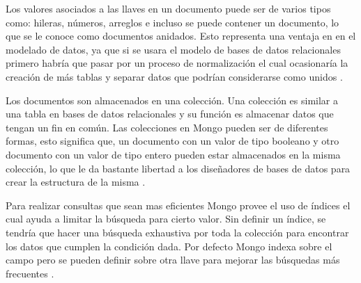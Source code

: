 \documentclass[conference,compsoc]{sty/IEEEtran}
\begin{document}
Los valores asociados a las llaves en un documento puede ser de varios tipos como: hileras, números, arreglos e incluso se puede contener un documento, lo que se le conoce como documentos anidados.  Esto representa una ventaja en en el modelado de datos, ya que si se usara el modelo de bases de datos relacionales primero habría que pasar por un proceso de normalización el cual ocasionaría la creación de más tablas y separar datos que podrían considerarse como unidos \cite{Chodorow}.

Los documentos son almacenados en una colección. Una colección es similar a una tabla en bases de datos relacionales y su función es almacenar datos que tengan un fin en común. Las colecciones en Mongo pueden ser de diferentes formas, esto significa que, un documento con un valor de tipo booleano y otro documento con un valor de tipo entero pueden estar almacenados en la misma colección, lo que le da bastante libertad a los diseñadores de bases de datos para crear la estructura de la misma \cite{Chodorow}.

Para realizar consultas que sean mas eficientes Mongo provee el uso de índices el cual ayuda a limitar la búsqueda para cierto valor. Sin definir un índice, se tendría que hacer una búsqueda exhaustiva por toda la colección para encontrar los datos que cumplen la condición dada. Por defecto Mongo indexa sobre el campo  pero se pueden definir sobre otra llave para mejorar las búsquedas más frecuentes \cite{indiceMongo}.\par 
\end{document}
